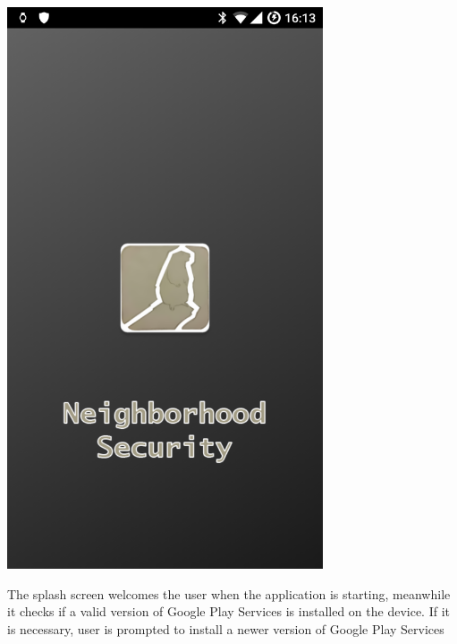 \documentclass[a4paper]{scrreprt}
\begin{document}
\begin{minipage}{0.5\textwidth}
	\centering
	\includegraphics[width=0.7\textwidth]{imgs/splash}
\end{minipage}
\begin{minipage}{0.5\textwidth}
	The splash screen welcomes the user when the application is starting, meanwhile it checks if a valid version of Google Play Services is installed on the device. If it is necessary, user is prompted to install a newer version of Google Play Services
\end{minipage}
\end{document}
